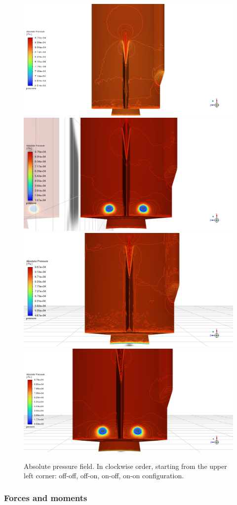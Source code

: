 \documentclass[12pt]{article}
\begin{document}
\begin{figure}[H]
    \centering
    \includegraphics[width=0.495\linewidth]{figs/t19s/vernier_zone_pabs_offoff.png}
    \includegraphics[width=0.495\linewidth]{figs/t19s/vernier_zone_pabs_offon.png}\\
    \includegraphics[width=0.495\linewidth]{figs/t19s/vernier_zone_pabs_onoff.png}
    \includegraphics[width=0.495\linewidth]{figs/t19s/vernier_zone_pabs_onon.png}
    \caption{Absolute pressure field. In clockwise order, starting from the upper left corner: off-off, off-on, on-off, on-on configuration.}
    \label{fig:pabs-conf-modes_t19s}
\end{figure}

\subsubsection*{Forces and moments}
\end{document}

